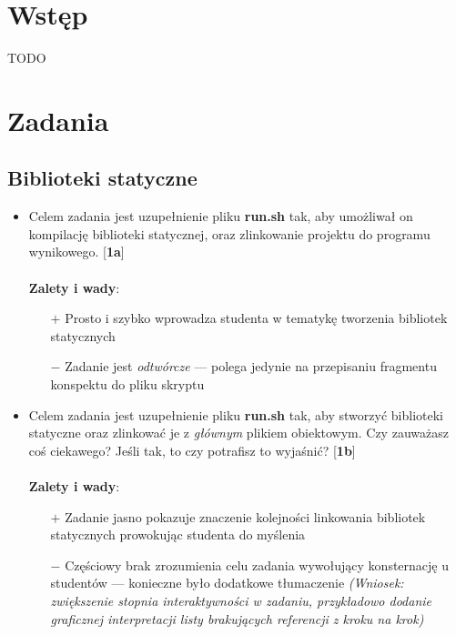 \documentclass[12pt]{article}
\begin{document}

\tableofcontents
\pagebreak


\section{Wstęp}
TODO

\section{Zadania}
\subsection{Biblioteki statyczne}
\begin{itemize}
\item Celem zadania jest uzupełnienie pliku \textbf{run.sh} tak, aby umożliwał
  on kompilację biblioteki statycznej, oraz zlinkowanie projektu do programu
  wynikowego. [\textbf{1a}]\\ \\
  \textbf{Zalety i wady}:
  \begin{itemize}
  \item[$+$] Prosto i szybko wprowadza studenta w tematykę tworzenia bibliotek
    statycznych
  \item[$-$] Zadanie jest \textit{odtwórcze} --- polega jedynie na przepisaniu
    fragmentu konspektu do pliku skryptu
  \end{itemize}
\item Celem zadania jest uzupełnienie pliku \textbf{run.sh} tak, aby stworzyć
  biblioteki statyczne oraz zlinkować je z \textit{głównym} plikiem obiektowym.
  Czy zauważasz coś ciekawego? Jeśli tak, to czy potrafisz to wyjaśnić?
  [\textbf{1b}]\\ \\
  \textbf{Zalety i wady}:
  \begin{itemize}
  \item[$+$] Zadanie jasno pokazuje znaczenie kolejności linkowania bibliotek
    statycznych prowokując studenta do myślenia
  \item[$-$] Częściowy brak zrozumienia celu zadania wywołujący konsternację u
    studentów --- konieczne było dodatkowe tłumaczenie \textit{(Wniosek:
      zwiększenie stopnia interaktywności w zadaniu, przykładowo dodanie
      graficznej interpretacji listy brakujących referencji z kroku na krok)}
  \end{itemize}
\end{itemize}
\end{document}
